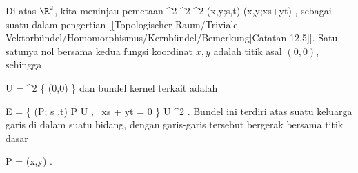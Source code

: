 {

Di atas $\R^2$, kita meninjau pemetaan
\maabbeledisp {} {\R^2 \times \R^2} { \R^2 \times \R
} {(x,y;s,t)} { (x,y;xs+yt)
} {,}
sebagai suatu
dalam pengertian
[[Topologischer Raum/Triviale Vektorbündel/Homomorphismus/Kernbündel/Bemerkung|Catatan 12.5]].
Satu-satunya nol bersama kedua fungsi koordinat $x,y$ adalah titik asal $(0,0)$, sehingga

\mavergleichskette
{\vergleichskette
{ U
}
{ = }{ \R^2 \setminus \{ (0,0) \}
}
{  }{
}
{    }{
}
{   }{
}
}
{}{}{}
dan bundel kernel terkait adalah

\mavergleichskettedisp
{\vergleichskette
{ E
}
{ =} { \left\{  (P; s ,t)   \mid   P \in U  , \,  xs + yt = 0       \right\}
}
{ \subseteq} { U \times \R^2
}
{ } {
}
{ } {
}
}
{}{}{.}
Bundel ini terdiri atas suatu keluarga garis di dalam suatu bidang, dengan garis-garis tersebut bergerak bersama titik dasar

\mavergleichskette
{\vergleichskette
{ P
}
{ = }{ (x,y)
}
{  }{
}
{    }{
}
{   }{
}
}
{}{}{}
.

}

